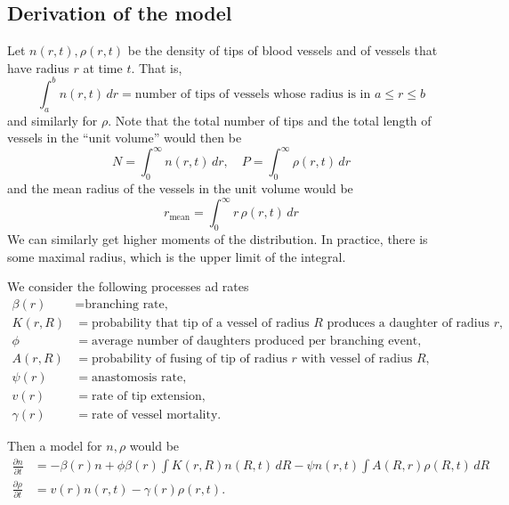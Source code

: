 \subsection{Derivation of the model}

Let $n(r,t), \rho(r,t)$ be the density of tips of blood vessels and of vessels that have radius $r$ at time $t$. That is,
\[
\int_a^b n(r,t) \, dr = \text{number of tips of vessels whose radius is in } a \le r \le b
\]
and similarly for $\rho$.
Note that the total number of tips and the total length of vessels in the ``unit volume'' would then be
\[
N=\int_0^\infty n(r,t) \, dr, \quad  P=\int_0^\infty \rho(r,t) \, dr
\]
and the mean radius of the vessels in the unit volume would be
\[
r_\text{mean}=\int_0^\infty r \, \rho(r,t) \, dr
\]
We can similarly get higher moments of the distribution. In practice, there is some maximal radius, which is the upper limit of the integral. 


We consider the following processes ad rates
\begin{align*}
	\beta(r)&= \text{branching rate,}\\
	K(r,R) &= \text{probability that tip of a vessel of radius } R \text{ produces a daughter of radius } r, \\
	\phi &= \text {average number of daughters produced per branching event},\\
	A(r,R)&= \text{probability of fusing of tip of radius }r \text{ with vessel of radius }R,\\
	\psi(r)&= \text{anastomosis rate},\\
	v(r)&= \text{rate of tip extension},\\
	\gamma(r) &= \text{rate of vessel mortality}.    
\end{align*}

Then a model for $n,\rho$ would be
\begin{align}
	\frac{\partial n}{\partial t} &= -\beta(r) n + \phi \beta(r) \int K(r,R) n(R,t) \, dR - \psi n(r,t) \int A(R,r)\rho(R,t)\, dR\\
	\frac{\partial \rho}{\partial t} &= v(r) n(r,t) - \gamma(r) \rho(r,t)  .
\end{align}

